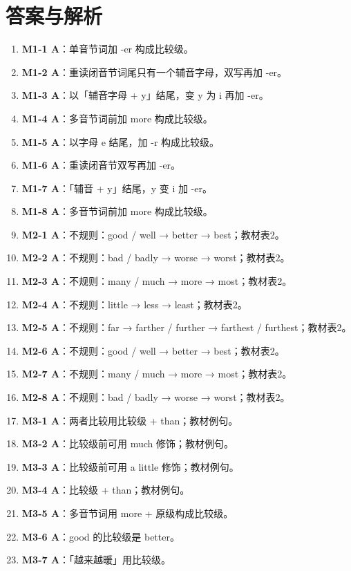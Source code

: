\documentclass[11pt,a4paper]{ctexart}
\begin{document}
\section*{答案与解析}
\small
\begin{enumerate}[leftmargin=1.6em,itemsep=2pt]
\item \textbf{M1-1 A}：单音节词加 -er 构成比较级。
\item \textbf{M1-2 A}：重读闭音节词尾只有一个辅音字母，双写再加 -er。
\item \textbf{M1-3 A}：以「辅音字母 + y」结尾，变 y 为 i 再加 -er。
\item \textbf{M1-4 A}：多音节词前加 more 构成比较级。
\item \textbf{M1-5 A}：以字母 e 结尾，加 -r 构成比较级。
\item \textbf{M1-6 A}：重读闭音节双写再加 -er。
\item \textbf{M1-7 A}：「辅音 + y」结尾，y 变 i 加 -er。
\item \textbf{M1-8 A}：多音节词前加 more 构成比较级。
\item \textbf{M2-1 A}：不规则：good / well → better → best；教材表2。
\item \textbf{M2-2 A}：不规则：bad / badly → worse → worst；教材表2。
\item \textbf{M2-3 A}：不规则：many / much → more → most；教材表2。
\item \textbf{M2-4 A}：不规则：little → less → least；教材表2。
\item \textbf{M2-5 A}：不规则：far → farther / further → farthest / furthest；教材表2。
\item \textbf{M2-6 A}：不规则：good / well → better → best；教材表2。
\item \textbf{M2-7 A}：不规则：many / much → more → most；教材表2。
\item \textbf{M2-8 A}：不规则：bad / badly → worse → worst；教材表2。
\item \textbf{M3-1 A}：两者比较用比较级 + than；教材例句。
\item \textbf{M3-2 A}：比较级前可用 much 修饰；教材例句。
\item \textbf{M3-3 A}：比较级前可用 a little 修饰；教材例句。
\item \textbf{M3-4 A}：比较级 + than；教材例句。
\item \textbf{M3-5 A}：多音节词用 more + 原级构成比较级。
\item \textbf{M3-6 A}：good 的比较级是 better。
\item \textbf{M3-7 A}：「越来越暖」用比较级。

\end{enumerate}
\end{document}
